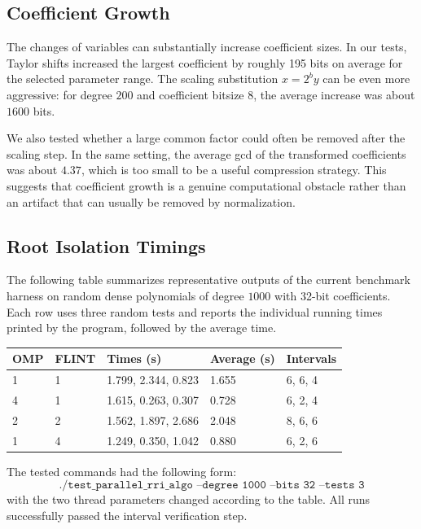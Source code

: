 \documentclass[letterpaper]{article}
\begin{document}
\subsection{Coefficient Growth}

The changes of variables can substantially increase coefficient sizes. In our
tests, Taylor shifts increased the largest coefficient by roughly 195 bits on
average for the selected parameter range. The scaling substitution
$x=2^b y$ can be even more aggressive: for degree $200$ and coefficient
bitsize $8$, the average increase was about $1600$ bits.

We also tested whether a large common factor could often be removed after the
scaling step. In the same setting, the average gcd of the transformed
coefficients was about $4.37$, which is too small to be a useful compression
strategy. This suggests that coefficient growth is a genuine computational
obstacle rather than an artifact that can usually be removed by normalization.

\subsection{Root Isolation Timings}

The following table summarizes representative outputs of the current
benchmark harness on random dense polynomials of degree $1000$ with
32-bit coefficients. Each row uses three random tests and reports the
individual running times printed by the program, followed by the average time.

\begin{center}
\small
\begin{tabular}{lllll}
\toprule
OMP & FLINT & Times (s) & Average (s) & Intervals \\
\midrule
1 & 1 & 1.799, 2.344, 0.823 & 1.655 & 6, 6, 4 \\
4 & 1 & 1.615, 0.263, 0.307 & 0.728 & 6, 2, 4 \\
2 & 2 & 1.562, 1.897, 2.686 & 2.048 & 8, 6, 6 \\
1 & 4 & 1.249, 0.350, 1.042 & 0.880 & 6, 2, 6 \\
\bottomrule
\end{tabular}
\end{center}

The tested commands had the following form:
\[
  \texttt{./test\_parallel\_rri\_algo --degree 1000 --bits 32 --tests 3}
\]
with the two thread parameters changed according to the table. All runs
successfully passed the interval verification step.
\end{document}
